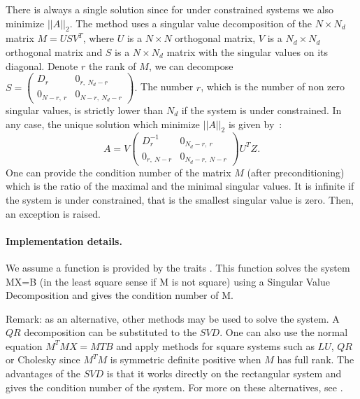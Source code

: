 There is always a single solution since for under constrained systems
we also minimize $||A||_2$.  The method uses a singular value
decomposition of the $N\times N_d$ matrix $M= U S V^T$, where $U$ is a
$N \times N$ orthogonal matrix, $V$ is a $N_d \times N_d$ orthogonal
matrix and $S$ is a $N\times N_d$ matrix with the singular values on
its diagonal. Denote $r$ the rank of $M$, we can decompose
%
$S= \left( \begin{array}{cc}
D_r & 0_{r,\ N_d-r}\\
0_{N-r,\ r} & 0_{N-r,\ N_d-r}
\end{array} 
\right).
$
%
The number $r$, which is the number of non zero singular values, is
strictly lower than $N_d$ if the system is under constrained. In any
case, the unique solution which minimize $||A||_2$ is given by~:
\begin{equation}
A= V
\left( \begin{array}{cc}
D_r^{-1} & 0_{N_d-r,\ r}\\
0_{r,\ N-r} & 0_{N_d-r,\ N-r}
\end{array} 
\right)
 U^TZ.
\end{equation}
One can provide the condition number of the matrix $M$ (after
preconditioning) which is the ratio of the maximal and the minimal
singular values. It is infinite if the system is under constrained,
that is the smallest singular value is zero. Then, an exception is
raised.

\paragraph{Implementation details.}
We assume a  function is provided by the traits
. This function solves the system MX=B (in the least square sense
if M is not square) using a Singular Value Decomposition and gives the
condition number of M. 

\medskip
Remark: as an alternative, other methods may be used to solve the
system. A $QR$ decomposition can be substituted to the $SVD$. One can
also use the normal equation $M^TMX=MTB$ and apply methods for square
systems such as $LU$, $QR$ or Cholesky since $M^TM$ is symmetric
definite positive when $M$ has full rank. 
The advantages of the $SVD$
is that it works directly on the rectangular system and gives the
condition number of the system. For more on these alternatives, see
\cite{gl-mc-83}.

